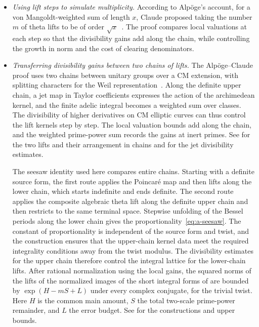 \begin{itemize}
\item \emph{Using lift steps to simulate multiplicity.} According to Alpöge's account, for a von Mangoldt-weighted sum of length $x$, Claude proposed taking the number $m$ of theta lifts to be of order $\sqrt{x}$~\cite[p.~1]{Alpoge2026}. The proof compares local valuations at each step so that the divisibility gains add along the chain, while controlling the growth in norm and the cost of clearing denominators.

\item \emph{Transferring divisibility gains between two chains of lifts.} The Alpöge--Claude proof uses two chains between unitary groups over a CM extension, with splitting characters for the Weil representation~\cite{HKS1996}. Along the definite upper chain, a jet map in Taylor coefficients expresses the action of the archimedean kernel, and the finite adelic integral becomes a weighted sum over classes. The divisibility of higher derivatives on CM elliptic curves can thus control the lift kernels step by step. The local valuation bounds add along the chain, and the weighted prime-power sum records the gains at inert primes. See  for the two lifts and their arrangement in chains and  for the jet divisibility estimates.

The seesaw identity used here compares entire chains. Starting with a definite source form, the first route applies the Poincaré map and then lifts along the lower chain, which starts indefinite and ends definite. The second route applies the composite algebraic theta lift along the definite upper chain and then restricts to the same terminal space. Stepwise unfolding of the Bessel periods along the lower chain gives the proportionality~\eqref{eq:a-seesaw}. The constant of proportionality is independent of the source form and twist, and the construction ensures that the upper-chain kernel data meet the required integrality conditions away from the twist modulus. The divisibility estimates for the upper chain therefore control the integral lattice for the lower-chain lifts. After rational normalization using the local gains, the squared norms of the lifts of the normalized images of the short integral forms of  are bounded by $\exp(H-mS+L)$ under every complex conjugate, for the trivial twist. Here $H$ is the common main amount, $S$ the total two-scale prime-power remainder, and $L$ the error budget. See  for the constructions and upper bounds.


\end{itemize}
